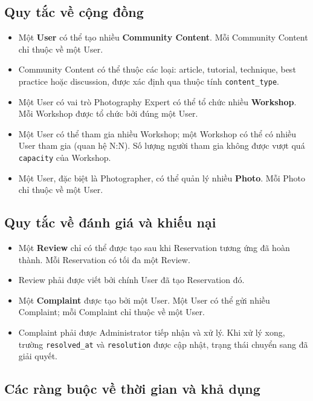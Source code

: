 \subsection{Quy tắc về cộng đồng}

\begin{itemize}
    \item Một \textbf{User} có thể tạo nhiều \textbf{Community Content}. Mỗi Community Content chỉ thuộc về một User.
    \item Community Content có thể thuộc các loại: article, tutorial, technique, best practice hoặc discussion, được xác định qua thuộc tính \texttt{content\_type}.
    \item Một User có vai trò Photography Expert có thể tổ chức nhiều \textbf{Workshop}. Mỗi Workshop được tổ chức bởi đúng một User.
    \item Một User có thể tham gia nhiều Workshop; một Workshop có thể có nhiều User tham gia (quan hệ N:N). Số lượng người tham gia không được vượt quá \texttt{capacity} của Workshop.
    \item Một User, đặc biệt là Photographer, có thể quản lý nhiều \textbf{Photo}. Mỗi Photo chỉ thuộc về một User.
\end{itemize}

\subsection{Quy tắc về đánh giá và khiếu nại}

\begin{itemize}
    \item Một \textbf{Review} chỉ có thể được tạo sau khi Reservation tương ứng đã hoàn thành. Mỗi Reservation có tối đa một Review.
    \item Review phải được viết bởi chính User đã tạo Reservation đó.
    \item Một \textbf{Complaint} được tạo bởi một User. Một User có thể gửi nhiều Complaint; mỗi Complaint chỉ thuộc về một User.
    \item Complaint phải được Administrator tiếp nhận và xử lý. Khi xử lý xong, trường \texttt{resolved\_at} và \texttt{resolution} được cập nhật, trạng thái chuyển sang đã giải quyết.
\end{itemize}

\subsection{Các ràng buộc về thời gian và khả dụng}

